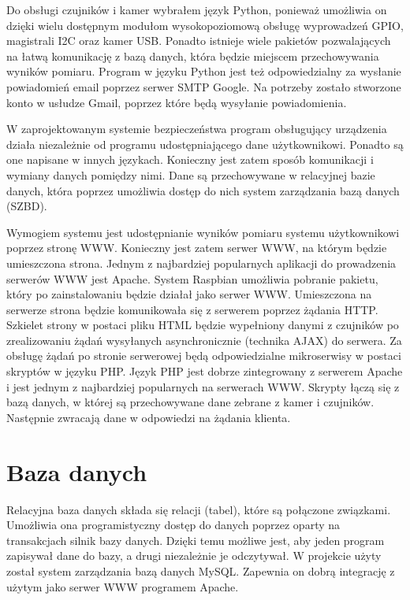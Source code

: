 \documentclass[a4paper,12pt,twoside]{article}
\begin{document}
Do obsługi czujników i kamer wybrałem język Python, ponieważ umożliwia on dzięki wielu dostępnym modułom wysokopoziomową obsługę wyprowadzeń GPIO, magistrali I2C oraz kamer USB. Ponadto istnieje wiele pakietów pozwalających na łatwą komunikację z bazą danych, która będzie miejscem przechowywania wyników pomiaru. Program w języku Python jest też odpowiedzialny za wysłanie powiadomień email poprzez serwer SMTP Google. Na potrzeby zostało stworzone konto w usłudze Gmail, poprzez które będą wysyłanie powiadomienia. 

W zaprojektowanym systemie bezpieczeństwa program obsługujący urządzenia działa niezależnie od programu udostępniającego dane użytkownikowi. Ponadto są one napisane w innych językach. Konieczny jest zatem sposób komunikacji i wymiany danych pomiędzy nimi. Dane są przechowywane w relacyjnej bazie danych, która poprzez umożliwia dostęp do nich system zarządzania bazą danych (SZBD).

Wymogiem systemu jest udostępnianie wyników pomiaru systemu użytkownikowi poprzez stronę WWW. Konieczny jest zatem serwer WWW, na którym będzie umieszczona strona. Jednym z najbardziej popularnych aplikacji do prowadzenia serwerów WWW jest Apache. System Raspbian umożliwia pobranie pakietu, który po zainstalowaniu będzie działał jako serwer WWW. Umieszczona na serwerze strona będzie komunikowała się z serwerem poprzez żądania HTTP. Szkielet strony w postaci pliku HTML będzie wypełniony danymi z czujników po zrealizowaniu żądań wysyłanych asynchronicznie (technika AJAX) do serwera. Za obsługę żądań po stronie serwerowej będą odpowiedzialne mikroserwisy w postaci skryptów w języku PHP. Język PHP jest dobrze zintegrowany z serwerem Apache i jest jednym z najbardziej popularnych na serwerach WWW. Skrypty łączą się z bazą danych, w której są przechowywane dane zebrane z kamer i czujników. Następnie zwracają dane w odpowiedzi na żądania klienta.

\section{Baza danych}
Relacyjna baza danych składa się relacji (tabel), które są połączone związkami. Umożliwia ona programistyczny dostęp do danych poprzez oparty na transakcjach silnik bazy danych. Dzięki temu możliwe jest, aby jeden program zapisywał dane do bazy, a drugi niezależnie je odczytywał. W projekcie użyty został system zarządzania bazą danych MySQL. Zapewnia on dobrą integrację z użytym jako serwer WWW programem Apache.
\end{document}
